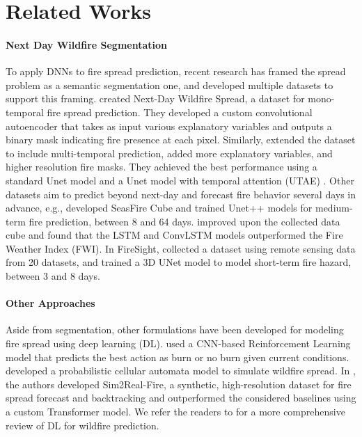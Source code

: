 \section{Related Works}
\label{sec:related_works}
\paragraph{Next Day Wildfire Segmentation} To apply DNNs to fire spread prediction, recent research has framed the spread problem as a semantic segmentation one, and developed multiple datasets to support this framing. \cite{huot2022next} created Next-Day Wildfire Spread, a dataset for mono-temporal fire spread prediction. They developed a custom convolutional autoencoder that takes as input various explanatory variables and outputs a binary mask indicating fire presence at each pixel. Similarly, \cite{gerard2023wildfirespreadts} extended the dataset to include multi-temporal prediction, added more explanatory variables, and higher resolution fire masks. They achieved the best performance using a standard Unet model and a Unet model with temporal attention (UTAE) \cite{garnot2021panoptic}. Other datasets aim to predict beyond next-day and forecast fire behavior several days in advance, e.g., \cite{prapas2022deep} developed SeasFire Cube and trained Unet++ models \cite{zhou2018unet++} for medium-term fire prediction, between 8 and 64 days. \cite{kondylatos2022wildfire} improved upon the collected data cube and found that the LSTM and ConvLSTM models outperformed the Fire Weather Index (FWI). In FireSight, \cite{gottfriedsenfiresight} collected a dataset using remote sensing data from 20 datasets, and trained a 3D UNet model to model short-term fire hazard, between 3 and 8 days.  

\paragraph{Other Approaches}  Aside from segmentation, other formulations have been developed for modeling fire spread using deep learning (DL). \cite{ross2021being} used a CNN-based Reinforcement Learning model that predicts the best action as burn or no burn given current conditions. \cite{ghosh2024fire} developed a probabilistic cellular automata model to simulate wildfire spread. In \cite{lisim2real}, the authors developed Sim2Real-Fire, a synthetic, high-resolution dataset for fire spread forecast and backtracking and outperformed the considered baselines using a custom Transformer model. We refer the readers to \cite{xu2024wildfire} for a more comprehensive review of DL for wildfire prediction. 

